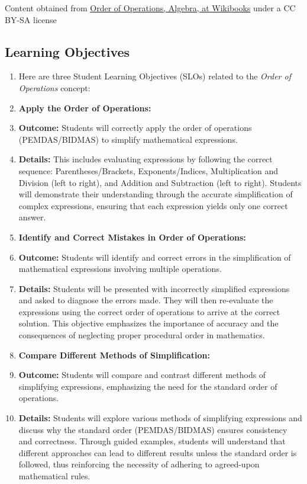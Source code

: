 Content obtained from \href{https://en.wikibooks.org/w/index.php?title=Algebra/Order_of_Operations\&oldid=3662722}{Order of Operations, Algebra, at Wikibooks} under a CC BY-SA license


\subsection{Learning Objectives}
\label{ssec:lear-fe6e}


\begin{enumerate}
    \item Here are three Student Learning Objectives (SLOs) related to the \textit{Order of Operations} concept:
    \item \textbf{Apply the Order of Operations:}
    \item \textbf{Outcome:} Students will correctly apply the order of operations (PEMDAS/BIDMAS) to simplify mathematical expressions.
    \item \textbf{Details:} This includes evaluating expressions by following the correct sequence: Parentheses/Brackets, Exponents/Indices, Multiplication and Division (left to right), and Addition and Subtraction (left to right). Students will demonstrate their understanding through the accurate simplification of complex expressions, ensuring that each expression yields only one correct answer.
    \item \textbf{Identify and Correct Mistakes in Order of Operations:}
    \item \textbf{Outcome:} Students will identify and correct errors in the simplification of mathematical expressions involving multiple operations.
    \item \textbf{Details:} Students will be presented with incorrectly simplified expressions and asked to diagnose the errors made. They will then re-evaluate the expressions using the correct order of operations to arrive at the correct solution. This objective emphasizes the importance of accuracy and the consequences of neglecting proper procedural order in mathematics.
    \item \textbf{Compare Different Methods of Simplification:}
    \item \textbf{Outcome:} Students will compare and contrast different methods of simplifying expressions, emphasizing the need for the standard order of operations.
    \item \textbf{Details:} Students will explore various methods of simplifying expressions and discuss why the standard order (PEMDAS/BIDMAS) ensures consistency and correctness. Through guided examples, students will understand that different approaches can lead to different results unless the standard order is followed, thus reinforcing the necessity of adhering to agreed-upon mathematical rules.
\end{enumerate}


